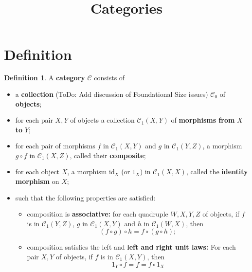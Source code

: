 \documentclass{article}
\title{Categories}
\theoremstyle{definition}
\newtheorem{definition}{Definition}[section]
\begin{document}
\maketitle

\begin{minipage}{0.4\textwidth}
    \begin{tcolorbox}
        \tableofcontents
    \end{tcolorbox}
\end{minipage}

\section{Definition}
\begin{definition}
    \label{Def:Category}
    A \textbf{category} $\mathcal{C}$ consists of 
    \begin{itemize}
        \item a \textbf{collection} (ToDo: Add discussion of Foundational Size issues) $\mathcal{C}_0$ of \textbf{objects};
        \item for each pair $X,Y$ of objects a collection $\mathcal{C}_1(X,Y)$ of \textbf{morphisms from} $X$ \textbf{to} $Y$;
        \item for each pair of morphisms $f$ in $\mathcal{C}_1(X,Y)$ and $g$ in $\mathcal{C}_1(Y,Z)$, a morphism $g \circ f$ in $\mathcal{C}_1(X,Z)$, called their \textbf{composite};
        \item for each object $X$, a morphism $\text{id}_X$ (or $1_X$) in $\mathcal{C}_1(X,X)$, called the \textbf{identity morphism} on $X$;
        \item such that the following properties are satisfied:
        \begin{itemize}
            \item composition is \textbf{associative:} for each quadruple $W, X, Y, Z$ of objects, if $f$ is in $\mathcal{C}_1(Y,Z)$, $g$ in $\mathcal{C}_1(X,Y)$ and $h$ in $\mathcal{C}_1(W,X)$, then
            \begin{equation}
                \label{Eq:CompIsAssoc}
                (f \circ g) \circ h = f \circ (g \circ h);
            \end{equation}
            \item composition satisfies the left and \textbf{left and right unit laws:} For each pair $X,Y$ of objects, if $f$ is in $\mathcal{C}_1(X,Y)$, then 
            \begin{equation}
                \label{Eq:CompUnitLaws}
                1_Y \circ f = f = f \circ 1_X    
            \end{equation}
        \end{itemize}
    \end{itemize}
\end{definition}
\end{document}
